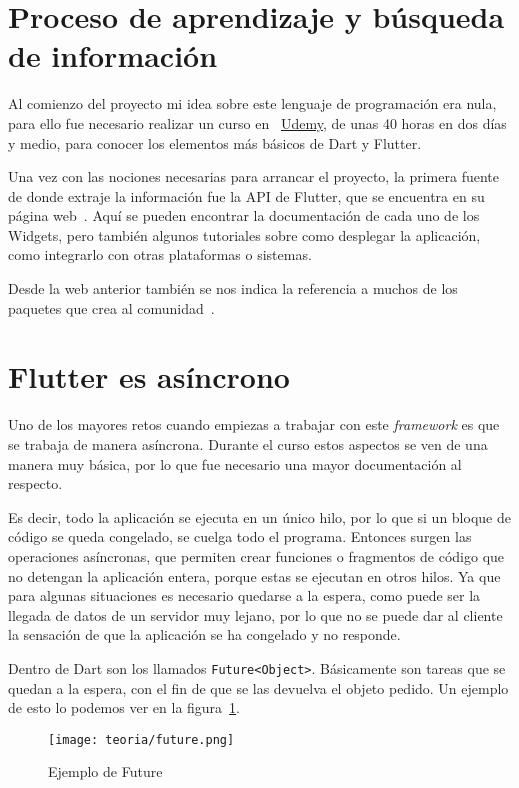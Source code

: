 \section{Proceso de aprendizaje y búsqueda de información}
Al comienzo del proyecto mi idea sobre este lenguaje de programación era nula, para ello fue necesario realizar un curso en ~\href{https://www.udemy.com/course/flutter-primeros-pasos/}{Udemy}, de unas 40 horas en dos días y medio, para conocer los elementos más básicos de Dart y Flutter.

Una vez con las nociones necesarias para arrancar el proyecto, la primera fuente de donde extraje la información fue la API de Flutter, que se encuentra en su página web~\cite{google:apiflutter}. Aquí se pueden encontrar la documentación de cada uno de los Widgets, pero también algunos tutoriales sobre como desplegar la aplicación, como integrarlo con otras plataformas o sistemas.

Desde la web anterior también se nos indica la referencia a muchos de los paquetes que crea al comunidad~\cite{google:pubdev}.


\section{Flutter es asíncrono}
Uno de los mayores retos cuando empiezas a trabajar con este \emph{framework} es que se trabaja de manera asíncrona. Durante el curso estos aspectos se ven de una manera muy básica, por lo que fue necesario una mayor documentación al respecto.

Es decir, todo la aplicación se ejecuta en un único hilo, por lo que si un bloque de código se queda congelado, se cuelga todo el programa. Entonces surgen las operaciones asíncronas, que permiten crear funciones o fragmentos de código que no detengan la aplicación entera, porque estas se ejecutan en otros hilos. Ya que para algunas situaciones es necesario quedarse a la espera, como puede ser la llegada de datos de un servidor muy lejano, por lo que no se puede dar al cliente la sensación de que la aplicación se ha congelado y no responde.

Dentro de Dart son los llamados \verb|Future<Object>|. Básicamente son tareas que se quedan a la espera, con el fin de que se las devuelva el objeto pedido. Un ejemplo de esto lo podemos ver en la figura~\ref{fig:future}.

\begin{figure}[H]
	\centering
	\texttt{[image: teoria/future.png]}
	\caption{Ejemplo de Future}\label{fig:future}
\end{figure}

